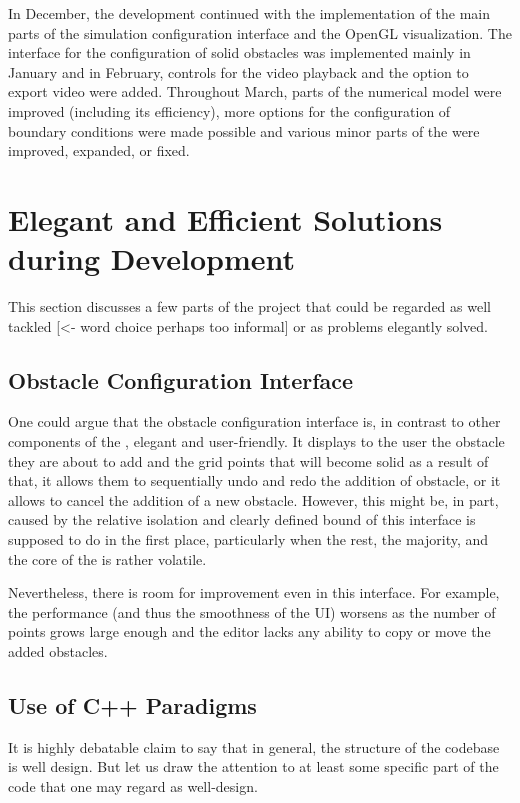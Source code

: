 \documentclass[11pt,a4paper,twoside,openright]{report}
\begin{document}
In December, the development continued with the implementation of the main parts of the simulation configuration interface and the OpenGL visualization. The interface for the configuration of solid obstacles was implemented mainly in January and in February, controls for the video playback and the option to export video were added. Throughout March, parts of the numerical model were improved (including its efficiency), more options for the configuration of boundary conditions were made possible and various minor parts of the \software{} were improved, expanded, or fixed.

\section{Elegant and Efficient Solutions during Development}
This section discusses a few parts of the project that could be regarded as well tackled [<- word choice perhaps too informal] or as problems elegantly solved.

\subsection{Obstacle Configuration Interface}
One could argue that the obstacle configuration interface is, in contrast to other components of the \software{}, elegant and user-friendly. It displays to the user the obstacle they are about to add and the grid points that will become solid as a result of that, it allows them to sequentially undo and redo the addition of obstacle, or it allows to cancel the addition of a new obstacle. However, this might be, in part, caused by the relative isolation and clearly defined bound of this interface is supposed to do in the first place, particularly when the rest, the majority, and the core of the \software{} is rather volatile.

Nevertheless, there is room for improvement even in this interface. For example, the performance (and thus the smoothness of the UI) worsens as the number of points grows large enough and the editor lacks any ability to copy or move the added obstacles.

\subsection{Use of C++ Paradigms}
It is highly debatable claim to say that in general, the structure of the codebase is well design. But let us draw the attention to at least some specific part of the code that one may regard as well-design.
\end{document}
